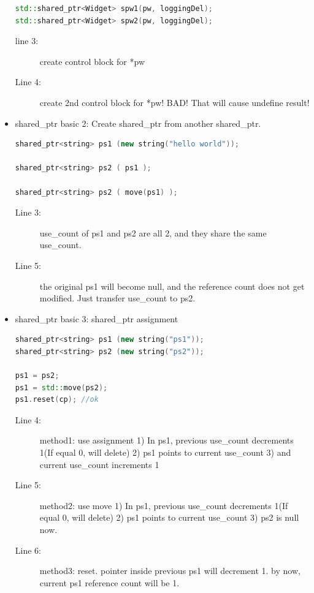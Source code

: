 \documentclass[a4paper,11pt,twoside]{book}
\begin{document}
\begin{itemize}
\begin{lstlisting}[frame=single, language=c++]
std::shared_ptr<Widget> spw1(pw, loggingDel);
std::shared_ptr<Widget> spw2(pw, loggingDel);
\end{lstlisting}
\begin{description}
	\item[line 3:] create control block for *pw
	\item[Line 4:] create 2nd control block for *pw! BAD! That will cause undefine result!
\end{description}

\item shared\_ptr basic 2: Create shared\_ptr from another shared\_ptr.
\begin{lstlisting}[frame=single, language=c++, mathescape=true]
shared_ptr<string> ps1 (new string("hello world"));

shared_ptr<string> ps2 ( ps1 );

shared_ptr<string> ps2 ( move(ps1) );
\end{lstlisting}
\begin{description}
	\item[Line 3:] use\_count of ps1 and ps2 are all 2, and they share the same use\_count.
	\item[Line 5:] the original ps1 will become null, and the reference count does not get modified. Just transfer use\_count to ps2. 
\end{description}

\item shared\_ptr basic 3: shared\_ptr assignment
\begin{lstlisting}[frame=single, language=c++, mathescape=true]
shared_ptr<string> ps1 (new string("ps1"));
shared_ptr<string> ps2 (new string("ps2"));

ps1 = ps2;
ps1 = std::move(ps2);
ps1.reset(cp); //ok
\end{lstlisting}
\begin{description}
	\item[Line 4:] method1: use assignment  1) In ps1, previous use\_count decrements 1(If equal 0, will delete) 2) ps1 points to current use\_count 3) and current use\_count increments 1
	
	\item[Line 5:] method2: use move 1) In ps1, previous use\_count decrements 1(If equal 0, will delete) 2) ps1 points to current use\_count 3) ps2 is null now. 
	
	\item[Line 6:] method3: reset. pointer inside previous ps1 will decrement 1. by now, current ps1 reference count will be 1.
\end{description}


\end{itemize}
\end{document}
